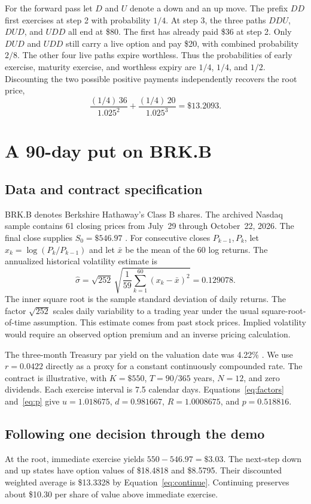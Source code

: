 \documentclass[11pt]{article}
\begin{document}
For the forward pass let $D$ and $U$ denote a down and an up move. The prefix $DD$ first exercises at step 2 with probability $1/4$. At step 3, the three paths $DDU$, $DUD$, and $UDD$ all end at \$80. The first has already paid \$36 at step 2. Only $DUD$ and $UDD$ still carry a live option and pay \$20, with combined probability $2/8$. The other four live paths expire worthless. Thus the probabilities of early exercise, maturity exercise, and worthless expiry are $1/4$, $1/4$, and $1/2$. Discounting the two possible positive payments independently recovers the root price,
\[
 \frac{(1/4)\,36}{1.025^2}+\frac{(1/4)\,20}{1.025^3}
 = \$13.2093.
\]

\section{A 90-day put on BRK.B}
\subsection{Data and contract specification}
BRK.B denotes Berkshire Hathaway's Class B shares. The archived Nasdaq sample contains 61 closing prices from July~29 through October~22, 2026. The final close supplies $S_0=\$546.97$ \citep{nasdaq}. For consecutive closes $P_{k-1},P_k$, let $x_k=\log(P_k/P_{k-1})$ and let $\bar{x}$ be the mean of the 60 log returns. The annualized historical volatility estimate is
\[
 \hat{\sigma}=\sqrt{252}\,
    \sqrt{\frac{1}{59}\sum_{k=1}^{60}(x_k-\bar{x})^2}
    =0.129078.
\]
The inner square root is the sample standard deviation of daily returns. The factor $\sqrt{252}$ scales daily variability to a trading year under the usual square-root-of-time assumption. This estimate comes from past stock prices. Implied volatility would require an observed option premium and an inverse pricing calculation.

The three-month Treasury par yield on the valuation date was 4.22\% \citep{treasury}. We use $r=0.0422$ directly as a proxy for a constant continuously compounded rate. The contract is illustrative, with $K=\$550$, $T=90/365$ years, $N=12$, and zero dividends. Each exercise interval is 7.5 calendar days. Equations~\eqref{eq:factors} and~\eqref{eq:p} give $u=1.018675$, $d=0.981667$, $R=1.0008675$, and $p=0.518816$.

\subsection{Following one decision through the demo}
At the root, immediate exercise yields $550-546.97=\$3.03$. The next-step down and up states have option values of \$18.4818 and \$8.5795. Their discounted weighted average is \$13.3328 by Equation~\eqref{eq:continue}. Continuing preserves about \$10.30 per share of value above immediate exercise.
\end{document}
